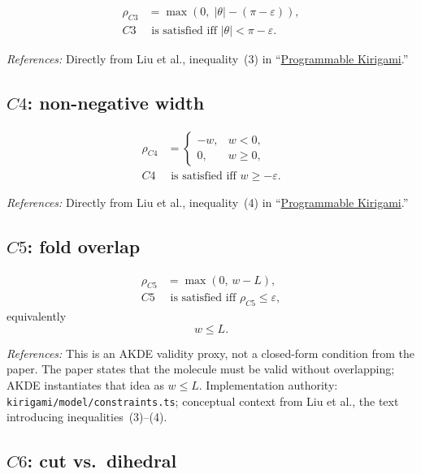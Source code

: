 \documentclass[11pt]{article}
\newcommand{\formularefs}[1]{%
\par\smallskip
\noindent\footnotesize\textit{References: }#1
\par\smallskip\normalsize
}
\begin{document}
\begin{align}
\rho_{C3} &= \max\!\left(0,\; |\theta| - (\pi-\varepsilon)\right), \\
C3 &\text{ is satisfied iff } |\theta| < \pi-\varepsilon.
\end{align}

\formularefs{Directly from Liu et al., inequality~(3) in ``\href{https://static1.squarespace.com/static/5783b6f903596e5098f3fce8/t/5dd2e95aee053940522eab1a/1574103423054/DETC2019-97557.pdf}{Programmable Kirigami}.''}

\subsection{$C4$: non-negative width}

\begin{align}
\rho_{C4} &=
\begin{cases}
-w, & w<0,\\
0, & w\ge 0,
\end{cases} \\
C4 &\text{ is satisfied iff } w \ge -\varepsilon.
\end{align}

\formularefs{Directly from Liu et al., inequality~(4) in ``\href{https://static1.squarespace.com/static/5783b6f903596e5098f3fce8/t/5dd2e95aee053940522eab1a/1574103423054/DETC2019-97557.pdf}{Programmable Kirigami}.''}

\subsection{$C5$: fold overlap}

\begin{align}
\rho_{C5} &= \max(0,\,w-L), \\
C5 &\text{ is satisfied iff } \rho_{C5} \le \varepsilon,
\end{align}
equivalently
\[
w \le L.
\]

\formularefs{This is an AKDE validity proxy, not a closed-form condition from the paper. The paper states that the molecule must be valid without overlapping; AKDE instantiates that idea as \(w \le L\). Implementation authority: \texttt{kirigami/model/constraints.ts}; conceptual context from Liu et al., the text introducing inequalities~(3)--(4).}

\subsection{$C6$: cut vs.\ dihedral}
\end{document}
